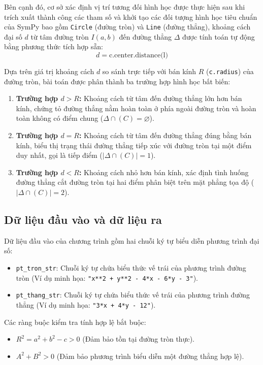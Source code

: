 \documentclass[12pt,a4paper]{article}
\begin{document}
Bên cạnh đó, cơ sở xác định vị trí tương đối hình học được thực hiện sau khi trích xuất thành công các tham số và khởi tạo các đối tượng hình học tiêu chuẩn của SymPy bao gồm \texttt{Circle} (đường tròn) và \texttt{Line} (đường thẳng), khoảng cách đại số $d$ từ tâm đường tròn $I(a, b)$ đến đường thẳng $\Delta$ được tính toán tự động bằng phương thức tích hợp sẵn:
$$d = \text{c.center.distance(l)}$$

Dựa trên giá trị khoảng cách $d$ so sánh trực tiếp với bán kính $R$ (\texttt{c.radius}) của đường tròn, bài toán được phân thành ba trường hợp hình học bất biến:
\begin{enumerate}
    \item \textbf{Trường hợp $d > R$:} Khoảng cách từ tâm đến đường thẳng lớn hơn bán kính, chứng tỏ đường thẳng nằm hoàn toàn ở phía ngoài đường tròn và hoàn toàn không có điểm chung ($\Delta \cap (C) = \varnothing$).
    \item \textbf{Trường hợp $d = R$:} Khoảng cách từ tâm đến đường thẳng đúng bằng bán kính, biểu thị trạng thái đường thẳng tiếp xúc với đường tròn tại một điểm duy nhất, gọi là tiếp điểm ($|\Delta \cap (C)| = 1$).
    \item \textbf{Trường hợp $d < R$:} Khoảng cách nhỏ hơn bán kính, xác định tình huống đường thẳng cắt đường tròn tại hai điểm phân biệt trên mặt phẳng tọa độ ($|\Delta \cap (C)| = 2$).
\end{enumerate}

\subsection{ Dữ liệu đầu vào và dữ liệu ra}

Dữ liệu đầu vào của chương trình gồm hai chuỗi ký tự biểu diễn phương trình đại số:
\begin{itemize}[leftmargin=*]
    \item \texttt{pt\_tron\_str}: Chuỗi ký tự chứa biểu thức vế trái của phương trình đường tròn (Ví dụ minh họa: \texttt{"x**2 + y**2 - 4*x - 6*y - 3"}).
    \item \texttt{pt\_thang\_str}: Chuỗi ký tự chứa biểu thức vế trái của phương trình đường thẳng (Ví dụ minh họa: \texttt{"3*x + 4*y - 12"}).
\end{itemize}
Các ràng buộc kiểm tra tính hợp lệ bắt buộc:
\begin{itemize}[leftmargin=*]
    \item $R^2 = a^2 + b^2 - c > 0$ (Đảm bảo tồn tại đường tròn thực).
    \item $A^2 + B^2 > 0$ (Đảm bảo phương trình biểu diễn một đường thẳng hợp lệ).
\end{itemize}
\end{document}
